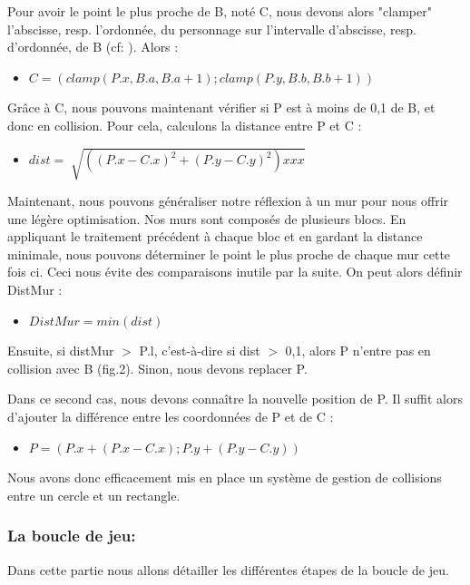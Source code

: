 \documentclass[11pt]{article}
\begin{document}
Pour avoir le point le plus proche de B, noté C, nous devons alors "clamper" 
l'abscisse, resp. l'ordonnée, du personnage sur l'intervalle d'abscisse, 
resp. d'ordonnée, de B (cf: ). Alors :

\begin{itemize}
	\item[] $C = (clamp(P.x, B.a, B.a +1) ; clamp(P.y, B.b, B.b +1))$
\end{itemize}

Grâce à C, nous pouvons maintenant vérifier si P est à moins de 0,1 de B, 
et donc en collision. Pour cela, calculons la distance entre P et C :
\begin{itemize}
	\item[] $dist = \sqrt[]{((P.x - C.x)^2 + (P.y - C.y)^2) xx  x}$
\end{itemize}

Maintenant, nous pouvons généraliser notre réflexion à un mur pour nous 
offrir une légère optimisation. Nos murs sont composés de plusieurs blocs. 
En appliquant le traitement précédent à chaque bloc et en gardant la 
distance minimale, nous pouvons déterminer le point le plus proche de 
chaque mur cette fois ci. Ceci nous évite des comparaisons inutile par la 
suite. On peut alors définir DistMur :

\begin{itemize}
	\item[] $DistMur = min(dist)$
\end{itemize}


Ensuite, si distMur $>$ P.l, c'est-à-dire si dist $>$ 0,1, alors P n'entre pas 
en collision avec B (fig.2). Sinon, nous devons replacer P.

Dans ce second cas, nous devons connaître la nouvelle position de P. Il 
suffit alors d'ajouter la différence entre les coordonnées de P et de C :

\begin{itemize}
	\item[] $P = (P.x + (P.x - C.x) ; P.y + (P.y - C.y))$
\end{itemize}

Nous avons donc efficacement mis en place un système de gestion de 
collisions entre un cercle et un rectangle.

\subsubsection{La boucle de jeu:}
Dans cette partie nous allons détailler les différentes étapes de la boucle de jeu.
\end{document}
